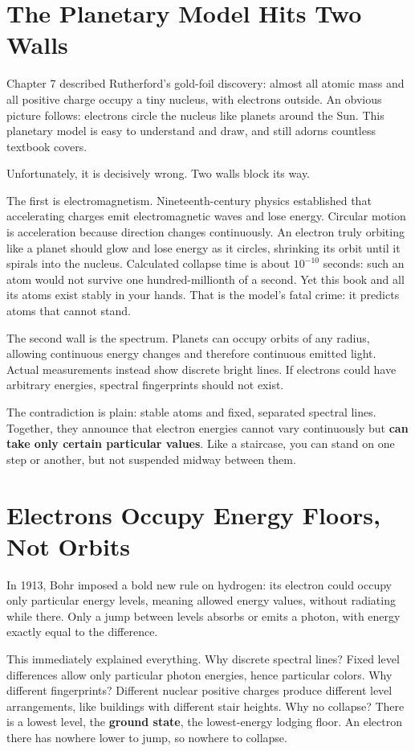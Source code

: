 \section{The Planetary Model Hits Two Walls}

Chapter 7 described Rutherford's gold-foil discovery: almost all atomic mass and all positive charge occupy a tiny nucleus, with electrons outside. An obvious picture follows: electrons circle the nucleus like planets around the Sun. This planetary model is easy to understand and draw, and still adorns countless textbook covers.

Unfortunately, it is decisively wrong. Two walls block its way.

The first is electromagnetism. Nineteenth-century physics established that accelerating charges emit electromagnetic waves and lose energy. Circular motion is acceleration because direction changes continuously. An electron truly orbiting like a planet should glow and lose energy as it circles, shrinking its orbit until it spirals into the nucleus. Calculated collapse time is about $10^{-10}$ seconds: such an atom would not survive one hundred-millionth of a second. Yet this book and all its atoms exist stably in your hands. That is the model's fatal crime: it predicts atoms that cannot stand.

The second wall is the spectrum. Planets can occupy orbits of any radius, allowing continuous energy changes and therefore continuous emitted light. Actual measurements instead show discrete bright lines. If electrons could have arbitrary energies, spectral fingerprints should not exist.

The contradiction is plain: stable atoms and fixed, separated spectral lines. Together, they announce that electron energies cannot vary continuously but \textbf{can take only certain particular values}. Like a staircase, you can stand on one step or another, but not suspended midway between them.

\section{Electrons Occupy Energy Floors, Not Orbits}

In 1913, Bohr imposed a bold new rule on hydrogen: its electron could occupy only particular energy levels, meaning allowed energy values, without radiating while there. Only a jump between levels absorbs or emits a photon, with energy exactly equal to the difference.

This immediately explained everything. Why discrete spectral lines? Fixed level differences allow only particular photon energies, hence particular colors. Why different fingerprints? Different nuclear positive charges produce different level arrangements, like buildings with different stair heights. Why no collapse? There is a lowest level, the \textbf{ground state}, the lowest-energy lodging floor. An electron there has nowhere lower to jump, so nowhere to collapse.

